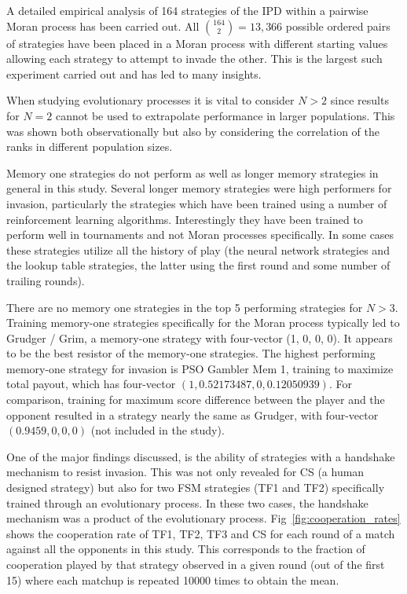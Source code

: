 \documentclass[10pt,letterpaper]{article}
\begin{document}
A detailed empirical analysis of 164 strategies of the IPD within a pairwise
Moran process has been carried out. All \(\binom{164}{2}=13,366\) possible
ordered pairs of strategies have been placed in a Moran process with different
starting values allowing each strategy to attempt to invade the other.
This is the largest such experiment carried out and has led to many insights.

When studying evolutionary processes it is vital to consider \(N>2\) since
results for \(N=2\) cannot be used to extrapolate performance in larger
populations. This was shown both observationally
 but also by
considering the correlation of the ranks in different population sizes.

Memory one strategies do not perform as well as longer memory strategies in general
in this study. Several longer memory strategies were high performers for invasion,
particularly the strategies which have been trained using a number of reinforcement
learning algorithms. Interestingly they have been trained to perform well in
tournaments and not Moran processes specifically. In some cases these strategies
utilize all the history of play (the neural network strategies and the lookup
table strategies, the latter using the first round and some number of trailing rounds).

There are no memory one strategies in the top 5 performing strategies
for \(N>3\). Training memory-one strategies specifically for the Moran process
typically led to Grudger / Grim, a memory-one strategy with
four-vector (1, 0, 0, 0). It appears to be the best resistor of the memory-one strategies.
The highest performing memory-one strategy for invasion is PSO Gambler Mem 1,
training to maximize total payout, which has four-vector $(1, 0.52173487, 0, 0.12050939)$.
For comparison, training for maximum score difference between the player and the
opponent resulted in a strategy nearly the same as Grudger, with four-vector
$(0.9459, 0, 0, 0)$ (not included in the study).


One of the major findings discussed, is
the ability of strategies with a handshake mechanism to resist invasion. This
was not only revealed for CS (a human designed strategy) but also for
two FSM strategies (TF1 and TF2) specifically trained through an evolutionary
process. In these two cases, the handshake mechanism was a product of the
evolutionary process. Fig~\ref{fig:cooperation_rates} shows the cooperation
rate of TF1, TF2, TF3 and CS
for each round of a match against all the opponents in this study.
This corresponds to the fraction of cooperation played by that strategy observed
in a given round (out of the first 15) where each matchup is repeated 10000 times to
obtain the mean.
\end{document}
